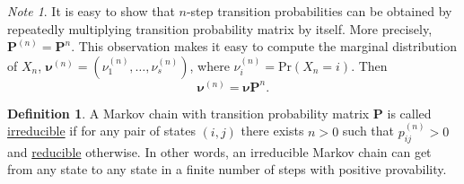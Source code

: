 \documentclass[11pt]{article}\usepackage[]{graphicx}\usepackage[]{color}
\numberwithin{algorithm}{section}
\theoremstyle{remark}
\newtheorem*{mynote}{Note}
\theoremstyle{definition}
\newtheorem*{define}{Definition}
\begin{document}
\begin{mynote}
  It is easy to show that $n$-step transition probabilities can be obtained by repeatedly multiplying
  transition probability matrix by itself. More precisely, $\mathbf{P}^{(n)} = \mathbf{P}^n$. This observation
  makes it easy to compute the marginal distribution of $X_n$, 
  $\boldsymbol{\nu}^{(n)} = (\nu_1^{(n)},\dots,\nu_s^{(n)})$, 
  where $ \nu_i^{(n)} = \text{Pr}(X_n = i)$. Then  
  \begin{equation*}
    \boldsymbol{\nu}^{(n)} = \boldsymbol{\nu} \mathbf{P}^n.
  \end{equation*}
\end{mynote}

\begin{define}
  A Markov chain with transition probability matrix $\mathbf{P}$ is called \underline{irreducible} if 
  for any pair of states $(i,j)$ there exists $n > 0$ such that $p_{ij}^{(n)} > 0$ and 
  \underline{reducible} otherwise. In other words,
  an irreducible Markov chain can get from any state to any state in a finite number of steps with 
  positive provability.
\end{define}
\end{document}
